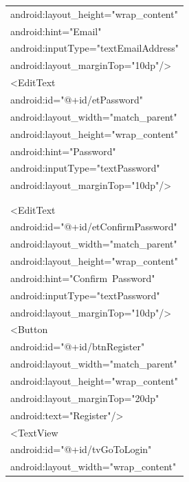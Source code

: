 \documentclass[a4paper,12pt]{article}
\begin{document}
\begin{longtable}{|p{}|}
{\ttfamily\small android:layout\_height="wrap\_content"} \\
{\ttfamily\small android:hint="Email"} \\
{\ttfamily\small android:inputType="textEmailAddress"} \\
{\ttfamily\small android:layout\_marginTop="10dp"/\textgreater{}} \\
{\ttfamily\small \textless{}EditText} \\
{\ttfamily\small android:id="@+id/etPassword"} \\
{\ttfamily\small android:layout\_width="match\_parent"} \\
{\ttfamily\small android:layout\_height="wrap\_content"} \\
{\ttfamily\small android:hint="Password"} \\
{\ttfamily\small android:inputType="textPassword"} \\
{\ttfamily\small android:layout\_marginTop="10dp"/\textgreater{}} \\
\strut \\
\strut \\
{\ttfamily\small \textless{}EditText} \\
{\ttfamily\small android:id="@+id/etConfirmPassword"} \\
{\ttfamily\small android:layout\_width="match\_parent"} \\
{\ttfamily\small android:layout\_height="wrap\_content"} \\
{\ttfamily\small android:hint="Confirm\ Password"} \\
{\ttfamily\small android:inputType="textPassword"} \\
{\ttfamily\small android:layout\_marginTop="10dp"/\textgreater{}} \\
{\ttfamily\small \textless{}Button} \\
{\ttfamily\small android:id="@+id/btnRegister"} \\
{\ttfamily\small android:layout\_width="match\_parent"} \\
{\ttfamily\small android:layout\_height="wrap\_content"} \\
{\ttfamily\small android:layout\_marginTop="20dp"} \\
{\ttfamily\small android:text="Register"/\textgreater{}} \\
{\ttfamily\small \textless{}TextView} \\
{\ttfamily\small android:id="@+id/tvGoToLogin"} \\
{\ttfamily\small android:layout\_width="wrap\_content"} \\

\end{longtable}
\end{document}
